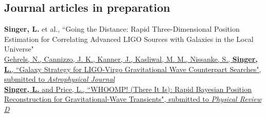 \documentclass[10pt, letterpaper]{article} %
\newcommand{\years}[1]{\marginnote{\scriptsize #1}} %
\begin{document}

\subsection*{Journal articles in preparation}

\years{2015}\textbf{Singer, L.} et al., “Going the Distance: Rapid Three-Dimensional Position Estimation for Correlating Advanced LIGO Sources with Galaxies in the Local Universe"\\[0.125cm]
%
\years{2015}\href{http://arxiv.org/abs/1508.03608}{Gehrels, N., Cannizzo, J. K., Kanner, J., Kasliwal, M. M., Nissanke, S., \textbf{Singer, L.}, “Galaxy Strategy for LIGO-Virgo Gravitational Wave Counterpart Searches", submitted to \emph{Astrophysical Journal}}\\[0.125cm]
%
\years{2015}\href{http://arxiv.org/abs/1508.03634}{\textbf{Singer, L.} and Price, L., “WHOOMP! (There It Is): Rapid Bayesian Position Reconstruction for Gravitational-Wave Transients", submitted to \emph{Physical Review D}}
\end{document}
